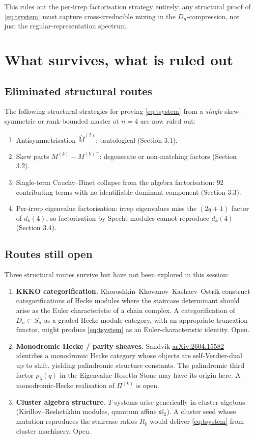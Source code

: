 \documentclass[11pt]{article}
\theoremstyle{definition}
\begin{document}
This rules out the per-irrep factorisation strategy entirely: any structural
proof of \eqref{eq:tsystem} must capture cross-irreducible mixing in the
$D_n$-compression, not just the regular-representation spectrum.

\section{What survives, what is ruled out}

\subsection{Eliminated structural routes}

The following structural strategies for proving \eqref{eq:tsystem} from a
\emph{single} skew-symmetric or rank-bounded master at $n=4$ are now ruled out:
\begin{enumerate}
\item Antisymmetrisation $\hat M^{(2)}$: tautological (Section 3.1).
\item Skew parts $M^{(k)} - M^{(k)\top}$: degenerate or non-matching factors
(Section 3.2).
\item Single-term Cauchy--Binet collapse from the algebra factorisation:
$92$ contributing terms with no identifiable dominant component (Section 3.3).
\item Per-irrep eigenvalue factorisation: irrep eigenvalues miss the
$(2q+1)$ factor of $d_k(4)$, so factorisation by Specht modules cannot
reproduce $d_k(4)$ (Section 3.4).
\end{enumerate}

\subsection{Routes still open}

Three structural routes survive but have not been explored in this session:
\begin{enumerate}
\item \textbf{KKKO categorification.} Khoroshkin--Khovanov--Kashaev--Ostrik
construct categorifications of Hecke modules where the staircase determinant
should arise as the Euler characteristic of a chain complex. A
categorification of $D_n \subset S_n$ as a graded Hecke-module category, with
an appropriate truncation functor, might produce \eqref{eq:tsystem} as an
Euler-characteristic identity. Open.
\item \textbf{Monodromic Hecke / parity sheaves.} Sandvik
\href{https://arxiv.org/abs/2604.15582}{arXiv:2604.15582} identifies a
monodromic Hecke category whose objects are self-Verdier-dual up to shift,
yielding palindromic structure constants. The palindromic third factor
$p_\lambda(q)$ in the Eigenvalue Rosetta Stone may have its origin here.
A monodromic-Hecke realisation of $\Pi^{(k)}$ is open.
\item \textbf{Cluster algebra structure.} $T$-systems arise generically
in cluster algebras (Kirillov--Reshetikhin modules, quantum affine
$\mathfrak{sl}_2$). A cluster seed whose mutation reproduces the staircase
ratios $R_k$ would deliver \eqref{eq:tsystem} from cluster machinery. Open.
\end{enumerate}
\end{document}
